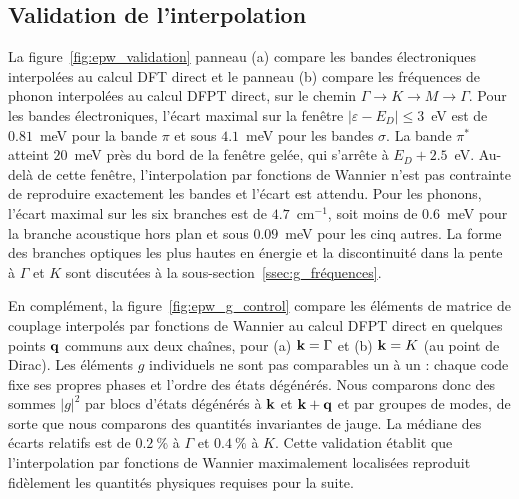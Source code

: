 \subsection{Validation de l'interpolation}

La figure~\ref{fig:epw_validation} panneau (a) compare les bandes électroniques interpolées au calcul DFT direct et le panneau (b) compare les fréquences de phonon interpolées au calcul DFPT direct, sur le chemin $\Gamma\to K\to M\to \Gamma$. Pour les bandes électroniques, l'écart maximal sur la fenêtre $|\varepsilon-E_D|\leq 3$~eV est de $0.81$~meV pour la bande $\pi$ et sous $4.1$~meV pour les bandes $\sigma$. La bande $\pi^*$ atteint $20$~meV près du bord de la fenêtre gelée, qui s'arrête à $E_D+2.5$~eV. Au-delà de cette fenêtre, l'interpolation par fonctions de Wannier n'est pas contrainte de reproduire exactement les bandes et l'écart est attendu. Pour les phonons, l'écart maximal sur les six branches est de $4.7$~cm$^{-1}$, soit moins de $0.6$~meV pour la branche acoustique hors plan et sous $0.09$~meV pour les cinq autres. La forme des branches optiques les plus hautes en énergie et la discontinuité dans la pente à $\Gamma$ et $K$ sont discutées à la sous-section~\ref{ssec:g_fréquences}.

En complément, la figure~\ref{fig:epw_g_control} compare les éléments de matrice de couplage interpolés par fonctions de Wannier au calcul DFPT direct en quelques points $\mathbf{q}$ communs aux deux chaînes, pour (a) $\mathbf{k}=\Gamma$ et (b) $\mathbf{k}=K$ (au point de Dirac). Les éléments $g$ individuels ne sont pas comparables un à un : chaque code fixe ses propres phases et l'ordre des états dégénérés. Nous comparons donc des sommes $|g|^2$ par blocs d'états dégénérés à $\mathbf{k}$ et $\mathbf{k}+\mathbf{q}$ et par groupes de modes, de sorte que nous comparons des quantités invariantes de jauge. La médiane des écarts relatifs est de $0.2~\%$ à $\Gamma$ et $0.4~\%$ à $K$. Cette validation établit que l'interpolation par fonctions de Wannier maximalement localisées reproduit fidèlement les quantités physiques requises pour la suite.

